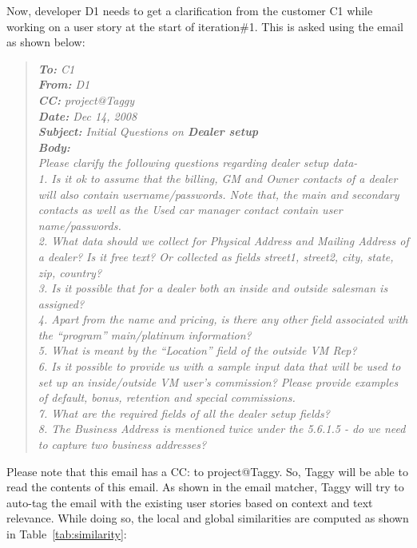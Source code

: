Now, developer D1 needs to get a clarification from the customer C1 while working on a user story at the start of iteration\#1. This is asked using the email as shown below:

\begin{quote}
	\emph{\textbf{To:} C1}\\
	\emph{\textbf{From:} D1}\\
	\emph{\textbf{CC:} project@Taggy}\\
	\emph{\textbf{Date:} Dec 14, 2008}\\
	\emph{\textbf{Subject:} Initial Questions on \textbf{Dealer setup}}\\
	\emph{\textbf{Body:}\\
	Please clarify the following questions regarding dealer setup data-\\
	1. Is it ok to assume that the billing, GM and Owner contacts of a dealer will also contain username/passwords. Note that, the main and secondary contacts as well as the Used car manager contact contain user name/passwords.\\
	2. What data should we collect for Physical Address and Mailing Address of a dealer? Is it free text? Or collected as fields street1, street2, city, state, zip, country?\\
	3. Is it possible that for a dealer both an inside and outside salesman is assigned?\\
	4. Apart from the name and pricing, is there any other field associated with the ``program'' {main/platinum} information?\\
	5. What is meant by the ``Location'' field of the outside VM Rep?\\
	6. Is it possible to provide us with a sample input data that will be used to set up an inside/outside VM user's commission? Please provide examples of default, bonus, retention and special commissions.\\
	7. What are the required fields of all the dealer setup fields?\\
	8. The Business Address is mentioned twice under the 5.6.1.5 - do we need to capture two business addresses?
	}\\
\end{quote}

Please note that this email has a CC: to project@Taggy. So, Taggy will be able to read the contents of this email. As shown in the email matcher, Taggy will try to auto-tag the email with the existing user stories based on context and text relevance. While doing so, the local and global similarities are computed as shown in Table~\ref{tab:similarity}:

